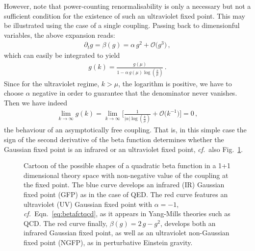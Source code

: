 \documentclass[11pt]{book}
\newcommand\cf{\textit{cf.}\ }
\numberwithin{equation}{chapter}
\begin{document}
However, note that power-counting renormalisability is only a
necessary but not a sufficient condition for the existence of such an ultraviolet
fixed point. This may be illustrated using the case of a single
coupling. Passing back to dimensionful variables, the above expansion
reads:
\begin{align}
  \partial_t g =
  \beta(g) =
  \alpha \, g^2
  + \mathcal O \big( g^3 \big) \,,
  \label{eq:betafctqcd}
\end{align}
which can easily be integrated to yield
\begin{align}
  g(k) =
  \frac{
    g(\mu)
  }{
    1 - \alpha \, g(\mu) \log \left( \frac k{\mu} \right)
  } \,.
\end{align}
Since for the ultraviolet regime, $k>\mu$, the logarithm
is positive, we have to choose $\alpha$ negative
in order to guarantee that the denominator never
vanishes. Then we have indeed
\begin{align}
  \lim_{k \rightarrow \infty}
  g(k) =
  \lim_{k \rightarrow \infty}
  \Bigg[
    \frac{ 1 }{ | \alpha | \log \left( \frac k{\mu} \right) }
    + \mathcal O \big( k^{-1} \big)
  \Bigg]
  = 0 \,,
\end{align}
the behaviour of an asymptotically free coupling.
That is, in this simple case the sign of the second
derivative of the beta function determines whether
the Gaussian fixed point is an infrared or an ultraviolet
fixed point, \cf also Fig.~\ref{fig:shapesbetafunctions}.

\begin{figure}
  \begin{center}
    
  \end{center}
  \vspace*{-5mm}
  \caption{
    Cartoon of the possible shapes of a quadratic beta function
    in a 1+1 dimensional theory space with non-negative
    value of the coupling at the fixed point.
    The blue curve develops
    an infrared (IR) Gaussian fixed point (GFP) as in the case of QED.
    The red curve features an ultraviolet (UV) Gaussian fixed point
    with $\alpha = -1$, \cf Eqn.~\eqref{eq:betafctqcd}, as it
    appears in Yang-Mills theories such as QCD.
    The red curve finally, $\beta(g) = 2 \, g - g^2$, develops
    both an infrared Gaussian fixed point, as well as an
    ultraviolet non-Gaussian fixed point (NGFP),
    as in perturbative Einstein gravity.
  }
  \label{fig:shapesbetafunctions}
\end{figure}
\end{document}
